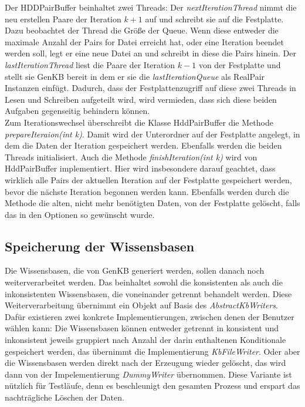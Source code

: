 \documentclass[12pt,a4paper]{article}
\begin{document}
Der HDDPairBuffer beinhaltet zwei Threads: Der \textit{nextIterationThread} nimmt die neu erstellen Paare der Iteration $k+1$ auf und schreibt sie auf die Festplatte. Dazu beobachtet der Thread die Größe der Queue. Wenn diese entweder die maximale Anzahl der Pairs for Datei erreicht hat, oder eine Iteration beendet werden soll, legt er eine neue Datei an und schreibt in diese die Pairs hinein. Der \textit{lastIterationThread} liest die Paare der Iteration $k-1$ von der Festplatte und stellt sie GenKB bereit in dem er sie die \textit{lastIterationQueue} als RealPair Instanzen einfügt. Dadurch, dass der Festplattenzugriff auf diese zwei Threads in Lesen und Schreiben aufgeteilt wird, wird vermieden, dass sich diese beiden Aufgaben gegenseitig behindern können. \\
Zum Iterationswechsel überschreibt die Klasse HddPairBuffer die Methode \textit{prepareIteraion(int k)}. Damit wird der Unterordner auf der Festplatte angelegt, in dem die Daten der Iteration gespeichert werden. Ebenfalls werden die beiden Threads initialisiert. Auch die Methode \textit{finishIteration(int k)} wird von HddPairBuffer implementiert. Hier wird insbesondere darauf geachtet, dass wirklich alle Pairs der aktuellen Iteration auf der Festplatte gespeichert werden, bevor die nächste Iteration begonnen werden kann. Ebenfalls werden durch die Methode die alten, nicht mehr benötigten Daten, von der Festplatte gelöscht, falls das in den Optionen so gewünscht wurde.







\subsection{Speicherung der Wissensbasen}
Die Wissensbasen, die von GenKB generiert werden, sollen danach noch weiterverarbeitet werden. Das beinhaltet sowohl die konsistenten als auch die inkonsistenten Wissensbasen, die voneinander getrennt behandelt werden. Diese Weiterverarbeitung übernimmt ein Objekt auf Basis des \textit{AbstractKbWriters}. Dafür existieren zwei konkrete Implementierungen, zwischen denen der Benutzer wählen kann: Die Wissensbasen können entweder getrennt in konsistent und inkonsistent jeweils gruppiert nach Anzahl der darin enthaltenen Konditionale gespeichert werden, das übernimmt die Implementierung \textit{KbFileWriter}. Oder aber die Wissensbasen werden direkt nach der Erzeugung wieder gelöscht, das wird dann von der Impelementierung \textit{DummyWriter} übernommen. Diese Variante ist nützlich für Testläufe, denn es beschleunigt den gesamten Prozess und erspart das nachträgliche Löschen der Daten.
\end{document}

